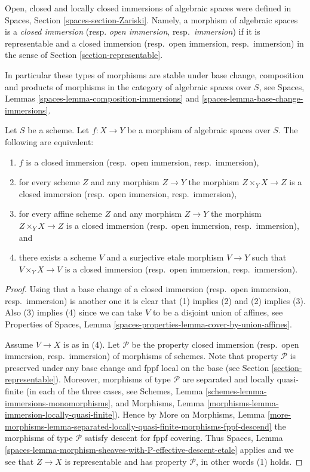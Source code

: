 \noindent
Open, closed and locally closed immersions of algebraic spaces were defined in
Spaces, Section \ref{spaces-section-Zariski}.
Namely, a morphism of algebraic spaces is a
{\it closed immersion} (resp. {\it open immersion}, resp.\ {\it immersion})
if it is representable and a closed immersion (resp.\ open immersion,
resp.\ immersion) in the sense of Section \ref{section-representable}.

\medskip\noindent
In particular these types of morphisms are stable under base change,
composition and products of morphisms in the category of algebraic
spaces over $S$, see
Spaces, Lemmas \ref{spaces-lemma-composition-immersions} and
\ref{spaces-lemma-base-change-immersions}.

\begin{lemma}
\label{lemma-characterize-closed-immersion}
Let $S$ be a scheme. Let $f : X \to Y$ be a morphism of algebraic spaces
over $S$. The following are equivalent:
\begin{enumerate}
\item $f$ is a closed immersion (resp.\ open immersion, resp.\ immersion),
\item for every scheme $Z$ and any morphism $Z \to Y$ the morphism
$Z \times_Y X \to Z$ is a closed immersion (resp.\ open immersion,
resp.\ immersion),
\item for every affine scheme $Z$ and any morphism
$Z \to Y$ the morphism $Z \times_Y X \to Z$ is a closed immersion
(resp.\ open immersion, resp.\ immersion), and
\item there exists a scheme $V$ and a surjective etale morphism
$V \to Y$ such that $V \times_Y X \to V$ is a closed immersion
(resp.\ open immersion, resp.\ immersion).
\end{enumerate}
\end{lemma}

\begin{proof}
Using that a base change of a
closed immersion (resp.\ open immersion, resp.\ immersion)
is another one it is clear that (1) implies (2) and (2) implies (3).
Also (3) implies (4) since we can take $V$ to be a disjoint union of
affines, see
Properties of Spaces,
Lemma \ref{spaces-properties-lemma-cover-by-union-affines}.

\medskip\noindent
Assume $V \to X$ is as in (4).
Let $\mathcal{P}$ be the property
closed immersion (resp.\ open immersion, resp.\ immersion)
of morphisms of schemes. Note that property $\mathcal{P}$
is preserved under any base change and fppf local on the
base (see Section \ref{section-representable}).
Moreover, morphisms of type $\mathcal{P}$ are separated and
locally quasi-finite (in each of the three cases, see
Schemes, Lemma \ref{schemes-lemma-immersions-monomorphisms}, and
Morphisms, Lemma \ref{morphisms-lemma-immersion-locally-quasi-finite}).
Hence
by
More on Morphisms, Lemma
\ref{more-morphisms-lemma-separated-locally-quasi-finite-morphisms-fppf-descend}
the morphisms of type $\mathcal{P}$ satisfy descent for fppf covering. Thus
Spaces, Lemma \ref{spaces-lemma-morphism-sheaves-with-P-effective-descent-etale}
applies and we see that $Z \to X$ is representable and has property
$\mathcal{P}$, in other words (1) holds.
\end{proof}



